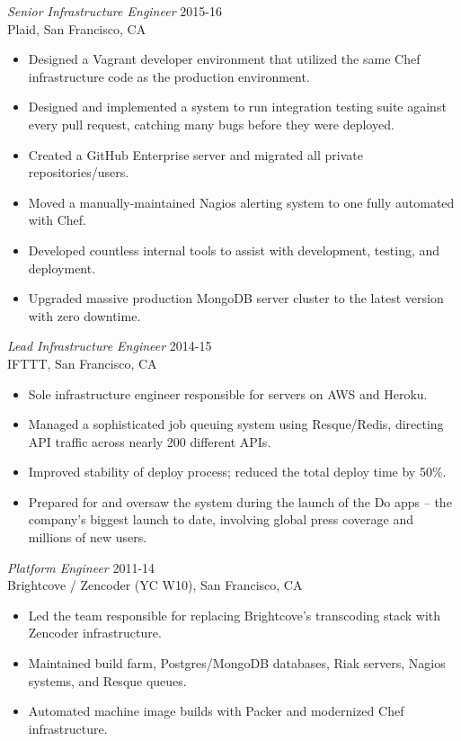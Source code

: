 \documentclass[line,margin]{res}
\begin{document}
\begin{resume}
  \textsl{Senior Infrastructure Engineer}  \hfill 2015-16 \\
  Plaid,
  San Francisco, CA
  \begin{itemize}  \itemsep -2pt %
    \item Designed a Vagrant developer environment that utilized the same Chef infrastructure code as the production environment.
    \item Designed and implemented a system to run integration testing suite against every pull request, catching many bugs before they were deployed.
    \item Created a GitHub Enterprise server and migrated all private repositories/users.
    \item Moved a manually-maintained Nagios alerting system to one fully automated with Chef.
    \item Developed countless internal tools to assist with development, testing, and deployment.
    \item Upgraded massive production MongoDB server cluster to the latest version with zero downtime.
  \end{itemize}

  \textsl{Lead Infrastructure Engineer}  \hfill 2014-15 \\
  IFTTT,
  San Francisco, CA
  \begin{itemize}  \itemsep -2pt %
    \item Sole infrastructure engineer responsible for servers on AWS and Heroku.
    \item Managed a sophisticated job queuing system using Resque/Redis, directing API traffic across nearly 200 different APIs.
    \item Improved stability of deploy process; reduced the total deploy time by 50\%.
    \item Prepared for and oversaw the system during the launch of the Do apps -- the company's biggest launch to date, involving global press coverage and millions of new users.
  \end{itemize}

  \textsl{Platform Engineer}  \hfill 2011-14 \\
  Brightcove / Zencoder {\scriptsize\textsf{(YC W10)}},
  San Francisco, CA
  \begin{itemize}  \itemsep -2pt %
    \item Led the team responsible for replacing Brightcove's transcoding stack with Zencoder infrastructure.
    \item Maintained build farm, Postgres/MongoDB databases, Riak servers, Nagios systems, and Resque queues.
    \item Automated machine image builds with Packer and modernized Chef infrastructure.
  \end{itemize}


\end{resume}
\end{document}

